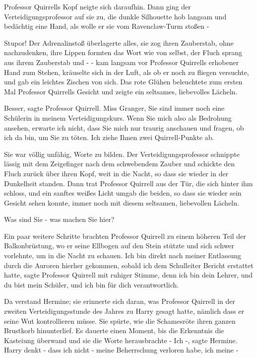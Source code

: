 Professor Quirrells Kopf neigte sich daraufhin. Dann ging der
Verteidigungsprofessor auf sie zu, die dunkle Silhouette hob langsam und
bedächtig eine Hand, als wolle er sie vom Ravenclaw-Turm stoßen -

\glqq Stupor!\grqq{} Der Adrenalinstoß überlagerte alles, sie zog ihren
Zauberstab, ohne nachzudenken, ihre Lippen formten das Wort wie von selbst, der
Fluch sprang aus ihrem Zauberstab und - - kam langsam vor Professor Quirrells
erhobener Hand zum Stehen, kräuselte sich in der Luft, als ob er noch zu fliegen
versuchte, und gab ein leichtes Zischen von sich. Das rote Glühen beleuchtete
zum ersten Mal Professor Quirrells Gesicht und zeigte ein seltsames, liebevolles
Lächeln.

\glqq Besser\grqq{}, sagte Professor Quirrell. \glqq Miss Granger, Sie sind
immer noch eine Schülerin in meinem Verteidigungskurs. Wenn Sie mich also als
Bedrohung ansehen, erwarte ich nicht, dass Sie mich nur traurig anschauen und
fragen, ob ich da bin, um Sie zu töten. Ich ziehe Ihnen zwei Quirrell-Punkte
ab.\grqq{}

Sie war völlig unfähig, Worte zu bilden. Der Verteidigungsprofessor schnippte
lässig mit dem Zeigefinger nach dem schwebendem Zauber und schickte den Fluch
zurück über ihren Kopf, weit in die Nacht, so dass sie wieder in der Dunkelheit
standen. Dann trat Professor Quirrell aus der Tür, die sich hinter ihm schloss,
und ein sanftes weißes Licht umgab die beiden, so dass sie wieder sein Gesicht
sehen konnte, immer noch mit diesem seltsamen, liebevollen Lächeln.

\glqq Was sind Sie - was machen Sie hier?\grqq{}

Ein paar weitere Schritte brachten Professor Quirrell zu einem höheren Teil der
Balkonbrüstung, wo er seine Ellbogen auf den Stein stützte und sich schwer
vorlehnte, um in die Nacht zu schauen. \glqq Ich bin direkt nach meiner
Entlassung durch die Auroren hierher gekommen, sobald ich dem Schulleiter
Bericht erstattet hatte\grqq{}, sagte Professor Quirrell mit ruhiger Stimme,
\glqq denn ich bin dein Lehrer, und du bist mein Schüler, und ich bin für dich
verantwortlich.\grqq{}

Da verstand Hermine; sie erinnerte sich daran, was Professor Quirrell in der
zweiten Verteidigungsstunde des Jahres zu Harry gesagt hatte, nämlich dass er
seine Wut kontrollieren müsse. Sie spürte, wie die Schamesröte ihren ganzen
Brustkorb hinunterlief. Es dauerte einen Moment, bis die Erkenntnis die
Kasteiung überwand und sie die Worte herausbrachte - \glqq Ich -\grqq{}, sagte
Hermine. \glqq Harry denkt - dass ich nicht - meine Beherrschung verloren habe,
ich meine -\grqq{}

